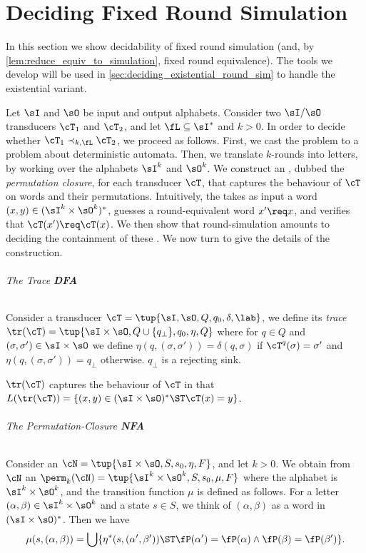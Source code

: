 \chapter{Deciding Fixed Round Simulation}
\label{chap:deciding_fixed_round_sim}

In this section we show decidability of fixed round simulation (and, by \cref{lem:reduce_equiv_to_simulation}, fixed round equivalence). The tools we develop will be used in \cref{sec:deciding_existential_round_sim} to handle the existential variant.

Let $\sI$ and $\sO$ be input and output alphabets. Consider two $\sI/\sO$ transducers $\cT_1$ and $\cT_2$, and let $\fL\subseteq \sI^*$ and $k>0$.
In order to decide whether $\cT_1\prec_{k,\fL} \cT_2$, we proceed as follows. First, we cast the problem to a problem about deterministic automata. Then, we translate $k$-rounds into letters, by working over the alphabets $\sI^k$ and $\sO^k$. We construct an \NFA, dubbed the \emph{permutation closure}, for each transducer $\cT$, that captures the behaviour of $\cT$ on words and their permutations. Intuitively, the \NFA takes as input a word $(x,y)\in (\sI^{k}\times \sO^k)^*$, guesses a round-equivalent word $x'\req x$, and verifies that $\cT(x')\req \cT(x)$. We then show that round-simulation amounts to deciding the containment of these \NFAs.
We now turn to give the details of the construction. 

\subparagraph*{The Trace \bf DFA}
Consider a transducer $\cT=\tup{\sI,\sO,Q,q_0,\delta,\lab}$, we define its \emph{trace \DFA} $\tr(\cT)=\tup{\sI\times\sO,Q\cup\{q_{\bot}\},q_0,\eta,Q}$ where for $q\in Q$ and $(\sigma,\sigma')\in \sI\times \sO$ we define $\eta(q,(\sigma,\sigma'))=\delta(q,\sigma)$ if $\cT^{q}(\sigma)=\sigma'$ and $\eta(q,(\sigma,\sigma'))=q_{\bot}$ otherwise.
$q_\bot$ is a rejecting sink. 

$\tr(\cT)$ captures the behaviour of $\cT$ in that $L(\tr(\cT))=\{(x,y)\in (\sI\times \sO)^*\ST \cT(x)=y\}$. 

\subparagraph*{The Permutation-Closure \bf NFA}
Consider an \NFA $\cN=\tup{\sI\times\sO,S,s_0,\eta,F}$, and let $k>0$. 
We obtain from $\cN$ an \NFA $\perm_k(\cN)=\tup{\sI^k \times \sO^k,S, s_0, \mu, F}$
where the alphabet is $\sI^k\times \sO^k$, and the transition function $\mu$ is defined as follows. For a letter $(\alpha,\beta)\in \sI^k \times \sO^k$ and a state $s\in S$, we think of $(\alpha,\beta)$ as a word in $(\sI\times \sO)^*$. Then we have
\begin{equation}
	\label{eq:perm_transition}
	\mu(s,(\alpha,\beta))=\bigcup\{\eta^*(s,(\alpha',\beta')) \ST \fP(\alpha')=\fP(\alpha) \wedge \fP(\beta)=\fP(\beta')\}.
\end{equation}

